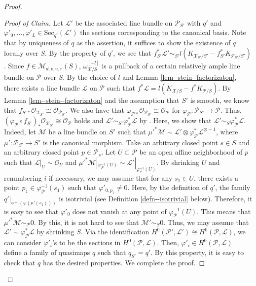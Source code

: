 \documentclass[10pt,a4paper]{amsart}
\begin{document}
\begin{proof}
\begin{proof}[Proof of Claim]   
Let $\mathscr{L}'$ be the associated line bundle on $\mathcal{P}_{S'}$ with $q'$ and $\varphi'_0,\ldots,\varphi'_{L}\in\mathrm{Sec}_{q'}(\mathscr{L}')$ the sections corresponding to the canonical basis.
Note that by uniqueness of $q$ as the assertion, it suffices to show the existence of $q$ locally over $S$.
    By the property of $q'$, we see that $f_{S'}^*\mathscr{L}'\sim_{S'}l(K_{\mathcal{X}_{S'}/S'}-f_{S'}^*K_{\mathcal{P}_{S'}/S'})$.
   Since $f\in \mathcal{M}_{d,v,u,r}(S)$, $\omega_{\mathcal{X}/S}^{[-l]}$ is a pullback of a certain relatively ample line bundle on $\mathcal{P}$ over $S$. 
    By the choice of $l$ and Lemma \ref{lem--stein--factorizaton}, there exists a line bundle $\mathscr{L}$ on $\mathcal{P}$ such that $f^*\mathscr{L}=l(K_{\mathcal{X}/S}-f^*K_{\mathcal{P}/S})$. 
    By Lemma \ref{lem--stein--factorizaton} and the assumption that $S'$ is smooth, we know that $f_{S'*}\mathcal{O}_{\mathcal{X}_{S'}}\cong \mathcal{O}_{\mathcal{P}_{S'}}$.
    We also have that $\varphi_{\mathcal{P}*}\mathcal{O}_{\mathcal{P}_{S'}}\cong\mathcal{O}_{\mathcal{P}}$ for $\varphi_{\mathcal{P}}\colon\mathcal{P}_{S'}\to \mathcal{P}$. 
    Thus, $(\varphi_{\mathcal{P}}\circ f_{S'})_*\mathcal{O}_{\mathcal{X}_{S'}}\cong \mathcal{O}_{\mathcal{P}}$ holds and $\mathscr{L}'\sim_{S'} \varphi_{\mathcal{P}}^*\mathscr{L}$ by \cite[Lemma 9.2.7]{FGA}.
    Here, we show that $\mathscr{L}'\sim_S\varphi_{\mathcal{P}}^*\mathscr{L}$.
    Indeed, let $\mathscr{M}$ be a line bundle on $S'$ such that $\mu'^*\mathscr{M}\sim\mathscr{L}'\otimes\varphi_{\mathcal{P}}^*\mathscr{L}^{\otimes -1}$, where $\mu'\colon \mathcal{P}_{S'}\to S'$ is the canonical morphism.
    Take an arbitrary closed point $s\in S$ and an arbitrary closed point $p\in \mathcal{P}_s$.
    Let $U\subset \mathcal{P}$ be an open affine neighborhood of $p$ such that $\mathscr{L}|_U\sim\mathcal{O}_U$ and $\mu'^*\mathscr{M}|_{\varphi_{\mathcal{P}}^{-1}(U)}\sim\mathscr{L}'|_{\varphi_{\mathcal{P}}^{-1}(U)}$.
    By shrinking $U$ and renumbering $i$ if necessary, we may assume that for any $s_1\in U$, there exists a point $p_1\in \varphi_{\mathcal{P}}^{-1}(s_1)$ such that $\varphi'_{0,p_1}\ne0$.
    Here, by the definition of $q'$, the family $q'|_{\varphi^{-1}(\varphi(\mu'(s_1)))}$ is isotrivial (see Definition \ref{defn--isotrivial} below).
    Therefore, it is easy to see that $\varphi'_0$ does not vanish at any point of $\varphi_{\mathcal{P}}^{-1}(U)$.
    This means that $\mu'^*\mathscr{M}\sim_{\mathcal{P}}0$.
    By this, it is not hard to see that $\mathscr{M}'\sim_S0$.
   Thus, we may assume that $\mathscr{L}'\sim\varphi_{\mathcal{P}}^*\mathscr{L}$ by shrinking $S$. 
    Via the identification $H^0(\mathcal{P}',\mathscr{L}')\cong H^0(\mathcal{P},\mathscr{L})$, we can consider $\varphi'_i$'s to be the sections in $H^0(\mathcal{P},\mathscr{L})$.
    Then, $\varphi'_i\in H^0(\mathcal{P},\mathscr{L})$ define a family of quasimaps $q$ such that $q_{S'}=q'$.
    By this property, it is easy to check that $q$ has the desired properties.
    We complete the proof. 
\end{proof}


\end{proof}
\end{document}

